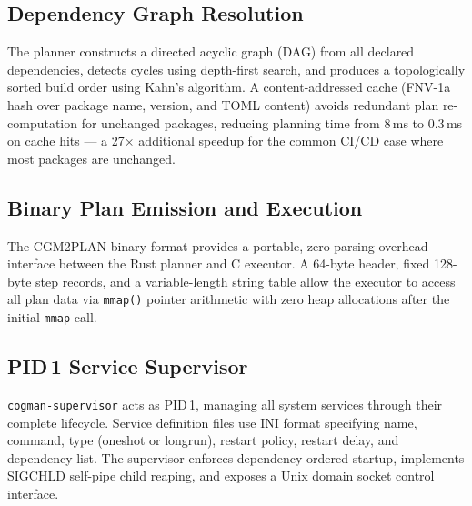 \documentclass[12pt,a4paper]{report}
\begin{document}
\subsection{Dependency Graph Resolution}
The planner constructs a directed acyclic graph (DAG) from all declared
dependencies, detects cycles using depth-first search, and produces a
topologically sorted build order using Kahn's algorithm. A content-addressed cache
(FNV-1a hash over package name, version, and TOML content) avoids redundant plan
re-computation for unchanged packages, reducing planning time from 8\,ms to
0.3\,ms on cache hits --- a 27$\times$ additional speedup for the common CI/CD
case where most packages are unchanged.

\subsection{Binary Plan Emission and Execution}
The CGM2PLAN binary format provides a portable, zero-parsing-overhead interface
between the Rust planner and C executor. A 64-byte header, fixed 128-byte step
records, and a variable-length string table allow the executor to access all plan
data via \texttt{mmap()} pointer arithmetic with zero heap allocations after the
initial \texttt{mmap} call.

\subsection{PID\,1 Service Supervisor}
\texttt{cogman-supervisor} acts as PID\,1, managing all system services through
their complete lifecycle. Service definition files use INI format specifying name,
command, type (oneshot or longrun), restart policy, restart delay, and dependency
list. The supervisor enforces dependency-ordered startup, implements SIGCHLD
self-pipe child reaping, and exposes a Unix domain socket control interface.
\end{document}
